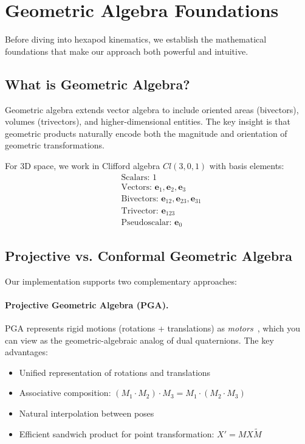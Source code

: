 \documentclass[11pt]{article}
\begin{document}
\section{Geometric Algebra Foundations}

Before diving into hexapod kinematics, we establish the mathematical foundations that make our approach both powerful and intuitive.

\subsection{What is Geometric Algebra?}

Geometric algebra extends vector algebra to include oriented areas (bivectors), volumes (trivectors), and higher-dimensional entities. The key insight is that geometric products naturally encode both the magnitude and orientation of geometric transformations.

For 3D space, we work in Clifford algebra $Cl(3,0,1)$ with basis elements:
\begin{align}
    &\text{Scalars: } 1\\
    &\text{Vectors: } \mathbf{e}_1, \mathbf{e}_2, \mathbf{e}_3\\
    &\text{Bivectors: } \mathbf{e}_{12}, \mathbf{e}_{23}, \mathbf{e}_{31}\\
    &\text{Trivector: } \mathbf{e}_{123}\\
    &\text{Pseudoscalar: } \mathbf{e}_0
\end{align}

\subsection{Projective vs. Conformal Geometric Algebra}

Our implementation supports two complementary approaches:

\paragraph{Projective Geometric Algebra (PGA).}
PGA represents rigid motions (rotations + translations) as \emph{motors}~\cite{gunn2011pga}, which you can view as the geometric-algebraic analog of dual quaternions. The key advantages:
\begin{itemize}
    \item Unified representation of rotations and translations
    \item Associative composition: $(M_1 \cdot M_2) \cdot M_3 = M_1 \cdot (M_2 \cdot M_3)$
    \item Natural interpolation between poses
    \item Efficient sandwich product for point transformation: $X' = M X \tilde{M}$
\end{itemize}
\end{document}
